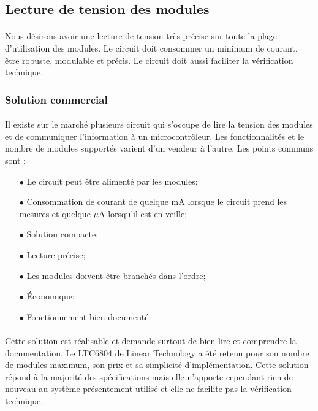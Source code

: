 
\subsection{Lecture de tension des modules}
	\paragraph*{}
	Nous désirons avoir une lecture de tension très précise sur toute la plage d'utilisation des modules. Le circuit doit consommer un minimum de courant, être robuste, modulable et précis. Le circuit doit aussi faciliter la vérification technique.
	
	\subsubsection*{Solution commercial}
	\paragraph*{}
	Il existe sur le marché plusieurs circuit qui s'occupe de lire la tension des modules et de communiquer l'information à un microcontrôleur. Les fonctionnalités et le nombre de modules supportés varient d'un vendeur à l'autre. Les points communs sont : 

	\begin{multicols}{2}
		\begin{itemize}
			\item[$\bullet$] Le circuit peut être alimenté par les modules;
			\item[$\bullet$] Consommation de courant de quelque mA lorsque le circuit prend les mesures et quelque $\mu$A lorsqu'il est en veille;
			\item[$\bullet$] Solution compacte;
			\item[$\bullet$] Lecture précise;
			\item[$\bullet$] Les modules doivent être branchés dans l'ordre;
			\item[$\bullet$] Économique;
			\item[$\bullet$] Fonctionnement bien documenté.
		\end{itemize}
	\end{multicols}

	\paragraph*{}
	Cette solution est réalisable et demande surtout de bien lire et comprendre la documentation. Le LTC6804 de Linear Technology a été retenu pour son nombre de modules maximum, son prix et sa simplicité d'implémentation. Cette solution répond à la majorité des spécifications mais elle n'apporte cependant rien de nouveau au système présentement utilisé et elle ne facilite pas la vérification technique. 
	
